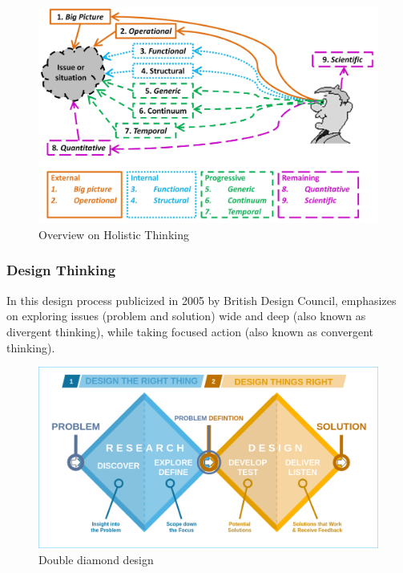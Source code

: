 \begin{figure}[!h]
    \centering
    \includegraphics[height=0.3\textheight]{res-ch2/HTPs.jpg}
    \caption[Holistic thinking overview]{Overview on Holistic Thinking \cite{kasser_2018}}
\end{figure}

\subsubsection{Design Thinking}

In this design process publicized in 2005 by British Design Council, emphasizes on exploring issues (problem and solution) wide and deep (also known as divergent thinking), while taking focused action (also known as convergent thinking). \cite{banathy_1996, BDC_2005}

\begin{figure}[!h]
    \centering
    \includegraphics[height=0.3\textheight]{res-ch2/Double_diamond.png}
    \caption{Double diamond design}
\end{figure}

\clearpage